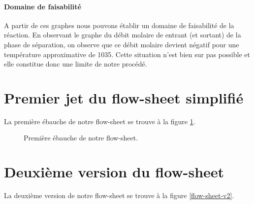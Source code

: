 \paragraph{Domaine de faisabilité}
A partir de ces graphes nous pouvons
établir un domaine de faisabilité de
la réaction. En observant le graphe
du débit molaire de  entrant
(et sortant) de la phase de séparation,
on observe que ce débit molaire
devient négatif pour une température
approximative de \unit{1035}{\kelvin}.
Cette situation n'est bien sur pas
possible et elle constitue donc une
limite de notre procédé.


\newpage
\annexe
\section{Premier jet du flow-sheet simplifié}
La première ébauche de notre flow-sheet se trouve à la figure \ref{flow-sheet}.

\begin{figure}[htb!]
	\centering
	\caption{Première ébauche de notre flow-sheet.}
	\label{flow-sheet}
\end{figure}
\newpage

\section{Deuxième version du flow-sheet}
\label{appendix:flow-sheet}
La deuxième version de notre flow-sheet se trouve à la figure \ref{flow-sheet-v2}.

